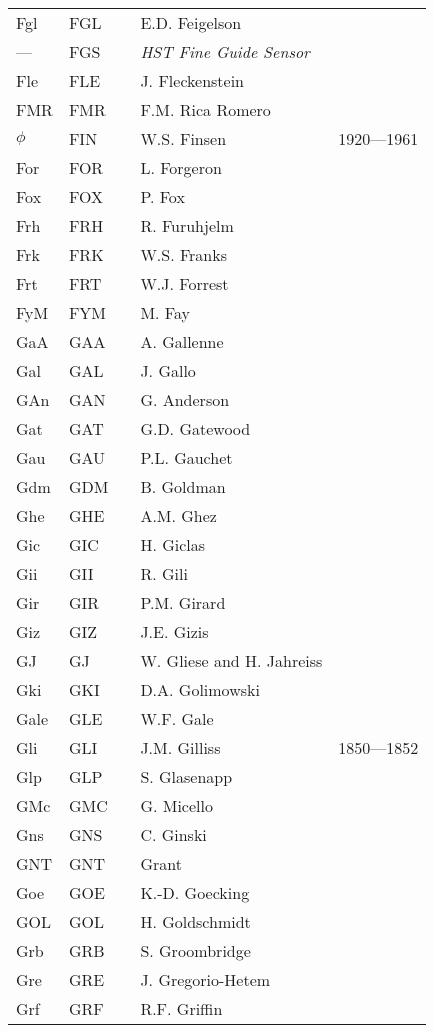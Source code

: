 \begin{longtable}{l|l|c|p{59mm}|l}
Fgl & FGL &   & E.D. Feigelson & \\
--- & FGS &   & \emph{HST Fine Guide Sensor} & \\
Fle & FLE &   & J. Fleckenstein & \\
FMR & FMR &   & F.M. Rica Romero & \\
$\phi$ & FIN &   & W.S. Finsen & 1920---1961 \\
For & FOR &   & L. Forgeron & \\
Fox & FOX &   & P. Fox & \\
Frh & FRH &   & R. Furuhjelm & \\
Frk & FRK &   & W.S. Franks & \\
Frt & FRT &   & W.J. Forrest & \\
FyM & FYM &   & M. Fay & \\\midrule
GaA & GAA &   & A. Gallenne & \\
Gal & GAL &   & J. Gallo & \\
GAn & GAN &   & G. Anderson & \\
Gat & GAT &   & G.D. Gatewood & \\
Gau & GAU &   & P.L. Gauchet & \\
Gdm & GDM &   & B. Goldman & \\
Ghe & GHE &   & A.M. Ghez & \\
Gic & GIC &   & H. Giclas & \\
Gii & GII &   & R. Gili & \\
Gir & GIR &   & P.M. Girard & \\
Giz & GIZ &   & J.E. Gizis & \\
GJ  & GJ  &   & W. Gliese and H. Jahreiss & \\
Gki & GKI &   & D.A. Golimowski & \\
Gale & GLE &   & W.F. Gale & \\
Gli & GLI &   & J.M. Gilliss & 1850---1852 \\
Glp & GLP &   & S. Glasenapp & \\
GMc & GMC &   & G. Micello & \\
Gns & GNS &   & C. Ginski & \\
GNT & GNT &   & Grant & \\
Goe & GOE &   & K.-D. Goecking & \\
GOL & GOL &   & H. Goldschmidt & \\
Grb & GRB &   & S. Groombridge & \\
Gre & GRE &   & J. Gregorio-Hetem & \\
Grf & GRF &   & R.F. Griffin & \\

\end{longtable}
